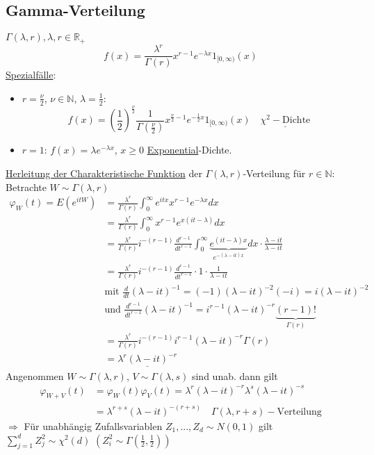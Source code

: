 \documentclass[a4paper,openany]{book}
\theoremstyle{mytheoremstyle}
\theoremstyle{mytheoremstyle2}
\begin{document}
\subsection{Gamma-Verteilung} $\Gamma(\lambda ,r),\lambda ,r \in \mathbb{R}_+$ 
\[
  f(x)=\frac{\lambda ^r}{\Gamma(r)}x^{r-1}e^{-\lambda x}1_{[0,\infty )}(x)
\]
\underline{Spezialfälle}:
\begin{itemize}
  \item $r=\frac{\nu }{2}$, $\nu \in \mathbb{N}$, $\lambda =\frac{1}{2}$:  
\[
  f(x)= \left(\frac{1}{2}\right)^{\frac{\nu }{2}}\frac{1}{\Gamma(\frac{\nu }{2})}x^{\frac{\nu }{2}-1}e^{-\frac{1}{2} x}1_{[0,\infty )}(x)\quad \underline{\chi ^2-\text{Dichte}}
\]
 \item $r=1$: $f(x)=\lambda e^{-\lambda x}$, $x \geq 0$ \underline{Exponential}-Dichte.
\end{itemize}
\underline{Herleitung der Charakteristische Funktion} der $\Gamma(\lambda ,r)$-Verteilung für $r \in  \mathbb{N}$:\\
Betrachte $W\sim \Gamma(\lambda ,r)$\\
\begin{align*}
  \varphi _W(t)=E(e^{itW})&=\frac{\lambda ^r}{\Gamma(r)}\int_{0}^{\infty }{e^{itx}x^{r-1}e^{-\lambda x}dx}\\
                          &=\frac{\lambda ^r}{\Gamma(r)}\int_{0}^{\infty }{x^{r-1}e^{x(it-\lambda )}dx}\\
                          &=\frac{\lambda ^r}{\Gamma(r)}i^{-(r-1)}\frac{d^{r-1}}{dt^{r-1}}\int_{0}^{\infty }{\underbrace{e^{(it-\lambda )x}}_{e^{-(\lambda -it)x} \text{}}dx}\cdot \frac{\lambda -it}{\lambda -it}\\
                          &=\frac{\lambda ^r}{\Gamma(r)}i^{-(r-1)}\frac{d^{r-1}}{dt^{r-1}}\cdot 1 \cdot \frac{1}{\lambda -it}\\
                          &\text{mit }\frac{d}{dt}(\lambda -it)^{-1}=(-1)(\lambda -it)^{-2}(-i)=i(\lambda -it)^{-2}\\
                          &\text{und }\frac{d^{r-1}}{dt^{r-1}}(\lambda -it)^{-1}=i^{r-1}(\lambda -it)^{-r}\underbrace{(r-1)!}_{\Gamma(r) \text{}}\\
                          &=\frac{\lambda ^r}{\Gamma(r)}i^{-(r-1)}i^{r-1}(\lambda -it)^{-r}\Gamma(r)\\
                          &=\underline{\lambda ^r(\lambda -it)^{-r}}
\end{align*} 
Angenommen $W\sim \Gamma(\lambda ,r)$, $V\sim \Gamma(\lambda ,s)$ sind unab. dann gilt 
\begin{align*}
  \varphi _{W+V}(t)&=\varphi _W(t)\varphi _V(t)=\lambda ^r(\lambda -it)^{-r}\lambda ^s(\lambda -it)^{-s}\\
                   &=\lambda ^{r+s}(\lambda -it)^{-(r+s)}\quad \Gamma(\lambda ,r+s)-\text{Verteilung}
\end{align*}
$\Rightarrow$ Für unabhängig Zufallsvariablen $Z_1,...,Z_d\sim N(0,1)$ gilt $\sum_{j=1}^{d}{Z_j^2}\sim \chi ^2(d)$ $(Z_i^2\sim\Gamma(\frac{1}{2},\frac{1}{2}))$
\end{document}
